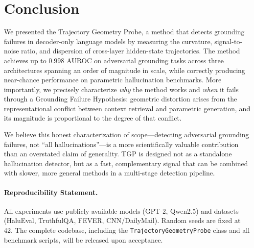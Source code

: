 \documentclass[10pt]{article}
\newcommand{\tgp}{\textsc{TGP}\xspace}
\begin{document}
\section{Conclusion}

We presented the Trajectory Geometry Probe, a method that detects grounding failures in decoder-only language models by measuring the curvature, signal-to-noise ratio, and dispersion of cross-layer hidden-state trajectories.
The method achieves up to $0.998$ AUROC on adversarial grounding tasks across three architectures spanning an order of magnitude in scale, while correctly producing near-chance performance on parametric hallucination benchmarks.
More importantly, we precisely characterize \emph{why} the method works and \emph{when} it fails through a Grounding Failure Hypothesis: geometric distortion arises from the representational conflict between context retrieval and parametric generation, and its magnitude is proportional to the degree of that conflict.

We believe this honest characterization of scope---detecting adversarial grounding failures, not ``all hallucinations''---is a more scientifically valuable contribution than an overstated claim of generality.
\tgp is designed not as a standalone hallucination detector, but as a fast, complementary signal that can be combined with slower, more general methods in a multi-stage detection pipeline.

\paragraph{Reproducibility Statement.}
All experiments use publicly available models (GPT-2, Qwen2.5) and datasets (HaluEval, TruthfulQA, FEVER, CNN/DailyMail).
Random seeds are fixed at 42.
The complete codebase, including the \texttt{TrajectoryGeometryProbe} class and all benchmark scripts, will be released upon acceptance.

\end{document}
